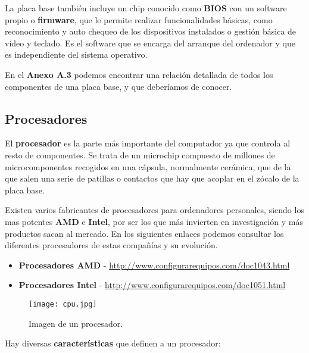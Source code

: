 La placa base también incluye un chip conocido como \textbf{\gls{BIOS}} con un software propio o \textbf{firmware}, que le permite realizar funcionalidades básicas, como reconocimiento y auto chequeo de los dispositivos instalados o gestión básica de vídeo y teclado. Es el software que se encarga del arranque del ordenador y que es independiente del sistema operativo.

En el \textbf{Anexo A.3} podemos encontrar una relación detallada de todos los componentes de una placa base, y que deberíamos de conocer.

\subsection{Procesadores}
El \textbf{procesador} es la parte más importante del computador ya que controla al resto de componentes. Se trata de un microchip compuesto de millones de microcomponentes recogidos en una cápsula, normalmente cerámica, que de la que salen una serie de patillas o contactos que hay que acoplar en el zócalo de la placa base.

Existen varios fabricantes de procesadores para ordenadores personales, siendo los mas potentes \textbf{AMD} e \textbf{Intel}, por ser los que más invierten en investigación y más productos sacan al mercado. En los siguientes enlaces podemos consultar los diferentes procesadores de estas compañías y su evolución.

\vspace{5ex}

\begin{itemize}
    \item \textbf{Procesadores AMD} - \url{http://www.configurarequipos.com/doc1043.html}
    \item \textbf{Procesadores Intel} - \url{http://www.configurarequipos.com/doc1051.html}
\end{itemize}

\begin{figure}[ht]
    \centering
    \texttt{[image: cpu.jpg]}
    \caption{Imagen de un procesador.}
\end{figure}

Hay diversas \textbf{características} que definen a un procesador:

